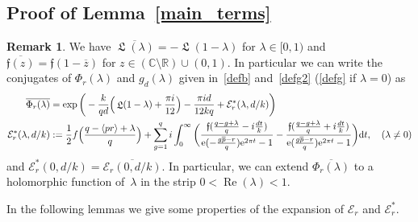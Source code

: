 \documentclass[11pt]{amsart}
\newcommand{\R}{\mathbb{R}}
\newcommand{\C}{\mathbb{C}}
\newcommand{\ang}[1]{\langle#1\rangle}
\newcommand{\lf}{{\mathfrak f}}
\newcommand{\Er}{{\mathcal E}}
\theoremstyle{definition}
\newtheorem{remark}{Remark}
\newcommand{\pr}[1]{\mathchoice{\left( #1\right)}{(#1)}{(#1)}{(#1)}}
\newcommand{\e}[1][]{\ifthenelse{\equal{#1}{}}{{\rm e}}{\operatorname{e}\pr{ #1}}}
\newcommand{\df}{\mathrm{d}}
\DeclareMathOperator{\Lie}{{\mathfrak L}}
\renewcommand\Re{\operatorname{Re}}
\newcommand{\1}{{\mathbf 1}}
\renewcommand{\bar}[1]{\overline{#1}}
\let\originalleft\left
\let\originalright\right
\renewcommand{\left}{\mathopen{}\mathclose\bgroup\originalleft}
\renewcommand{\right}{\aftergroup\egroup\originalright}
\numberwithin{equation}{section}
\begin{document}
\subsection{Proof of Lemma~\ref{main_terms}}\label{prolem}

\begin{remark}\label{conjex}
  We have $\bar{\Lie(\lambda)}=-\Lie(1-\lambda)$ for $\lambda\in[0,1)$ and $\overline {\lf(z)}=\lf(1-\overline z)$ for $z\in (\C \setminus \R)\cup(0,1)$. In particular we can write the conjugates of $\Phi_{r}(\lambda)$ and $g_d(\lambda)$ given in~\eqref{defb} and~\eqref{defg2} (\eqref{defg} if $\lambda=0$) as
  \begin{align*} 
    \overline{\Phi_{r}(\lambda)} &= \exp\bigg(-\frac k{qd} \Big(\Lie(1-\lambda) +\frac{\pi i }{12}\Big)-\frac{\pi i d}{12kq}+ {\Er_r^*(\lambda,d/k)} \bigg)\\
    {  \Er_r^*(\lambda,d/k)}&:= \frac12 f\Big(\frac{q-\ang{pr}+\lambda}q\Big)+ \sum_{g=1}^q i\int_{0}^\infty   \bigg( \frac{\lf(\frac{q-g+\lambda}q - i\frac{dt}k)}{\e[ -\frac{g\bar{p}-r}q]\e^{2\pi t}-1}-   \frac{\lf(\frac{q-g+\lambda}q + i\frac{dt}k)}{\e[ \frac{g\bar{p}-r}q]\e^{2\pi t}-1}\bigg)\df{t},\quad (\lambda\neq0)
  \end{align*}
  and $ \Er_r^*(0,d/k)=\overline { \Er_r(0,d/k)}$. In particular, we can extend $\overline{\Phi_{r}(\lambda)} $ to a holomorphic function of~$\lambda$ in the strip $0<\Re(\lambda)<1$.
\end{remark}

In the following lemmas we give some properties of the expansion of $\Er_r$ and $\Er_r^*$.
\end{document}
